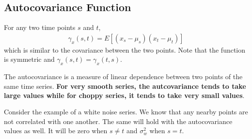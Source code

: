 \documentclass[../time_series_notes.tex]{subfiles}
\begin{document}
    
    \subsection{Autocovariance Function}
    For any two time points $s$ and $t$,
    \begin{align*}
        \gamma_{x}(s, t) = E[(x_{s} - \mu_{s})(x_{t} - \mu_{t})]
    \end{align*}
    which is similar to the covariance between the two points. Note that the function is symmetric and $\gamma_{x}(s, t) = \gamma_{x}(t, s)$.\newline

    The autocovariance is a measure of linear dependence between two points of the same time series. \textbf{For very smooth series, the autcovariance tends to take large values while for choppy series, it tends to take very small values}.\newline

    Consider the example of a white noise series. We know that any nearby points are not correlated with one another. The same will hold with the autocovariance values as well. It will be zero when $s \neq t$ and $\sigma_{w}^{2}$ when $s = t$.\newline
\end{document}
